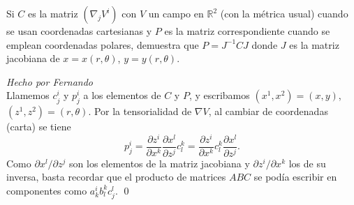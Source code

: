 \begin{problem}[7]Si $C$ es la matriz $(\nabla_j V^i)$ con $V$ un campo en $\mathbb{R}^2$ (con
	la métrica usual) cuando se usan coordenadas cartesianas y $P$ es
	la matriz correspondiente cuando se emplean coordenadas polares,
	demuestra que $P=J^{-1}CJ$ donde $J$ es la matriz jacobiana de $x=x(r,\theta)$,  $y=y(r,\theta)$.
	
	\solution\textit{Hecho por Fernando}\\ Llamemos $c_j^i$ y $p^i_j$ a los elementos de $C$ y $P$, y escribamos $(x^1,x^2)=(x,y)$, $(z^1,z^2)=(r,\theta)$. Por la tensorialidad de $\nabla V$, al cambiar de coordenadas (carta) se tiene 
	\[
	p^i_j
	=
	\frac{\partial z^i}{\partial x^k}
	\frac{\partial x^l}{\partial z^j}
	c_l^k
	=
	\frac{\partial z^i}{\partial x^k}
	c_l^k
	\frac{\partial x^l}{\partial z^j}.
	\]
	Como ${\partial x^l}/{\partial z^j}$ son los elementos de la matriz jacobiana y ${\partial z^i}/{\partial x^k}$ los de su inversa, basta recordar que el producto de matrices $ABC$ se podía escribir en componentes como $a^i_kb^k_lc^l_j$. \qed
	
	
\end{problem}
